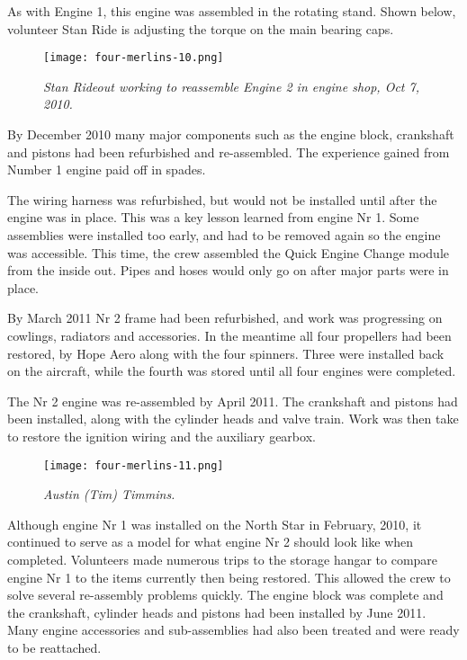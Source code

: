 As with Engine 1, this engine was assembled in the rotating stand.  Shown
below, volunteer Stan Ride is adjusting the torque on the main bearing caps.

\begin{figure}[htbp]
   \vspace{2em}
   \centering
   \texttt{[image: four-merlins-10.png]}
   \caption*{\small \em Stan Rideout working to reassemble Engine 2 in engine
shop, Oct 7, 2010.}
   \label{fig:tim}
\end{figure}

By December 2010 many major components such as the engine block, crankshaft and
pistons had been refurbished and re-assembled.  The experience gained from
Number 1 engine paid off in spades.

The wiring harness was refurbished, but would not be installed until after the
engine was in place.  This was a key lesson learned from engine Nr 1.  Some
assemblies were installed too early, and had to be removed again so the engine
was accessible.  This time, the crew assembled the Quick Engine Change  module
from the inside out.  Pipes and hoses would only go on after major parts were
in place.

By March 2011 Nr 2 frame had been refurbished, and work was progressing on
cowlings, radiators and accessories.  In the meantime all four propellers had
been restored, by Hope Aero along with the four spinners. Three were installed
back on the aircraft, while the fourth was stored until all four engines were
completed.

The Nr 2 engine was  re-assembled by April 2011. The crankshaft and pistons had
been installed, along with the cylinder heads and valve train. Work was then
take to restore the ignition wiring and the auxiliary gearbox. 

\begin{figure}[htbp]
   \vspace{2em}
   \centering
   \texttt{[image: four-merlins-11.png]}
   \caption*{\small \em Austin (Tim) Timmins.}
   \label{fig:tim}
\end{figure}

Although engine Nr 1 was installed on the North Star in February, 2010, it 
continued to serve as a model for what engine Nr 2 should look like when
completed.  Volunteers made numerous trips to the storage hangar to compare
engine Nr 1 to the items currently then being restored.  This allowed the crew
to solve several re-assembly problems quickly. The engine block was complete
and the crankshaft, cylinder heads and pistons had  been installed by June
2011. Many engine accessories and sub-assemblies had also been treated and were
ready to be reattached. 

